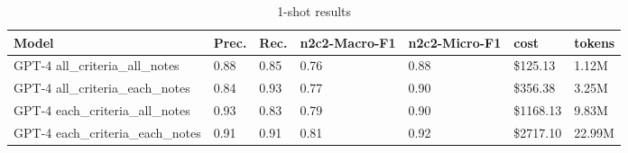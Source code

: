 \begin{table}
\caption{1-shot results}
\label{tab:1_shot}
\begin{tabular}{lllllll}
\toprule
Model & Prec. & Rec. & n2c2-Macro-F1 & n2c2-Micro-F1 & cost & tokens \\
\midrule
GPT-4 all_criteria_all_notes & 0.88 & 0.85 & 0.76 & 0.88 & \$125.13 & 1.12M \\
GPT-4 all_criteria_each_notes & 0.84 & 0.93 & 0.77 & 0.90 & \$356.38 & 3.25M \\
GPT-4 each_criteria_all_notes & 0.93 & 0.83 & 0.79 & 0.90 & \$1168.13 & 9.83M \\
GPT-4 each_criteria_each_notes & 0.91 & 0.91 & 0.81 & 0.92 & \$2717.10 & 22.99M \\
\bottomrule
\end{tabular}
\end{table}
